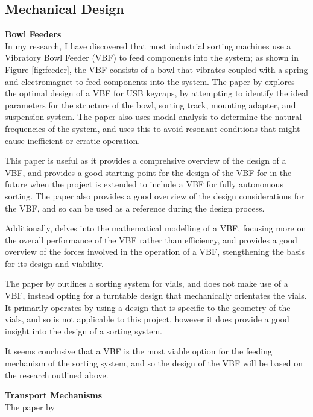 \subsection{Mechanical Design}
\noindent
\textbf{Bowl Feeders} \\
In my research, I have discovered that most industrial sorting machines use a Vibratory Bowl Feeder (VBF) to feed components into the system;
as shown in Figure \ref*{fig:feeder}, the VBF consists of a bowl that vibrates coupled with a spring and electromagnet to feed components into the system.
The paper by \citet{nam2019design} explores the optimal design of a VBF for USB keycaps, by attempting to identify the ideal parameters for the structure of the bowl,
sorting track, mounting adapter, and suspension system. The paper also uses modal analysis to determine the natural frequencies of the system, and uses this to
avoid resonant conditions that might cause inefficient or erratic operation.

This paper is useful as it provides a comprehsive overview of the design of a VBF, and provides a good starting point for the design of the VBF for in the future
when the project is extended to include a VBF for fully autonomous sorting. The paper also provides a good overview of the design considerations for the VBF, and so can be used as a reference
during the design process.

Additionally, \citet{REINHART2010191} delves into the mathematical modelling of a VBF, focusing more on the overall performance of the VBF rather than efficiency, and \citet{ForceAnalysisofVibratoryBowlFeeder}
provides a good overview of the forces involved in the operation of a VBF, stengthening the basis for its design and viability.

The paper by \citet{zhang2019design} outlines a sorting system for vials, and does not make use of a VBF, instead opting for a turntable design that mechanically orientates the vials. It primarily operates
by using a design that is specific to the geometry of the vials, and so is not applicable to this project, however it does provide a good insight into the design of a sorting system.

It seems conclusive that a VBF is the most viable option for the feeding mechanism of the sorting system, and so the design of the VBF will be based on the research outlined above.

\noindent
\textbf{Transport Mechanisms} \\
The paper by \citet{Dhenge2013MechanicalNS} 
